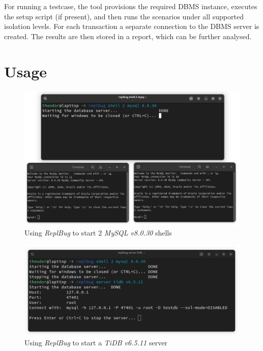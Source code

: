 For running a testcase, the tool provisions the required DBMS instance, executes the setup script (if present), and then runs the scenarios under all supported isolation levels. For each transaction a separate connection to the DBMS server is created. The results are then stored in a report, which can be further analysed.

\section{Usage}



\begin{figure}
    \centering
    \includegraphics[width=\linewidth]{assets/replbug_shell.png}
    \caption{Using \textit{ReplBug} to start 2 \textit{MySQL v8.0.30} shells}
    \label{fig:replb_shell}
\end{figure}

\begin{figure}
    \centering
    \includegraphics[width=\linewidth]{assets/replbug_server.png}
    \caption{Using \textit{ReplBug} to start a \textit{TiDB v6.5.11} server}
    \label{fig:repl_server}
\end{figure}

